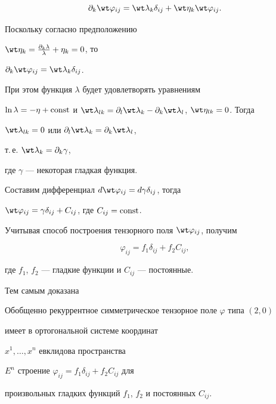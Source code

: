 $$


\partial_k \wt \varphi_{ij}=


\wt \lambda_k\delta_{ij}+\wt \eta_k \wt \varphi_{ij}.


$$


Поскольку согласно предположению


$\wt \eta_k=\frac{\partial_k\lambda}{\lambda}+\eta_k=0$, то


$\partial_k \wt \varphi_{ij}=\wt \lambda_k\delta_{ij}$.


При этом функция $\lambda$ будет удовлетворять уравнениям


$\ln \lambda=-\eta+\const$ и $\wt \lambda_{lk}=


\partial_l\wt \lambda_k-\partial_k\wt \lambda_l$, $\wt \eta_{lk}=0$. Тогда 


$\wt \lambda_{lk}=0$ или $\partial_l\wt \lambda_k=\partial_k\wt \lambda_l$,


т.\,е. $\wt \lambda_k=\partial_k\gamma$,


где $\gamma$ --- некоторая гладкая функция.





Составим дифференциал $d \wt \varphi_{ij}=d \gamma\delta_{ij}$, тогда


$\wt \varphi_{ij}=\gamma\delta_{ij}+C_{ij}$, где $C_{ij}=\operatorname{const}$.


Учитывая способ построения тензорного поля $\wt \varphi_{ij}$, получим


$$


\varphi_{ij}=f_1\delta_{ij}+f_2 C_{ij},


$$


где $f_1$, $f_2$ --- гладкие функции и $C_{ij}$ --- постоянные. 


Тем самым доказана





\begin{thm}


Обобщенно рекуррентное симметрическое тензорное поле $\varphi$ типа $(2,0)$


имеет в ортогональной системе координат


$x^1,\dotsc,x^n$ евклидова пространства


$E^n$ строение $\varphi_{ij}=f_1\delta_{ij}+f_2 C_{ij}$ для


произвольных гладких функций $f_1$, $f_2$ и постоянных $C_{ij}$.


\end{thm}








